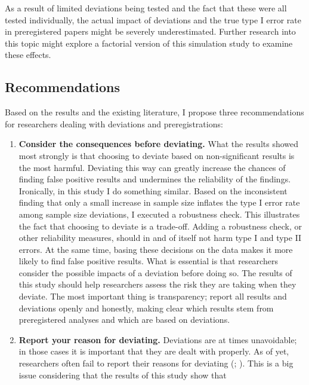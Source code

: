 \documentclass[
  man,
  floatsintext,
  longtable,
  nolmodern,
  notxfonts,
  notimes,
  colorlinks=true,linkcolor=blue,citecolor=blue,urlcolor=blue]{apa7}
\begin{document}
As a result of limited deviations being tested and the fact that these
were all tested individually, the actual impact of deviations and the
true type I error rate in preregistered papers might be severely
underestimated. Further research into this topic might explore a
factorial version of this simulation study to examine these effects.

\subsection{Recommendations}\label{recommendations}

Based on the results and the existing literature, I propose three
recommendations for researchers dealing with deviations and
preregistrations:

\begin{enumerate}
\def\labelenumi{\arabic{enumi}.}
\item
  \textbf{Consider the consequences before deviating.} What the results
  showed most strongly is that choosing to deviate based on
  non-significant results is the most harmful. Deviating this way can
  greatly increase the chances of finding false positive results and
  undermines the reliability of the findings. Ironically, in this study
  I do something similar. Based on the inconsistent finding that only a
  small increase in sample size inflates the type I error rate among
  sample size deviations, I executed a robustness check. This
  illustrates the fact that choosing to deviate is a trade-off. Adding a
  robustness check, or other reliability measures, should in and of
  itself not harm type I and type II errors. At the same time, basing
  these decisions on the data makes it more likely to find false
  positive results. What is essential is that researchers consider the
  possible impacts of a deviation before doing so. The results of this
  study should help researchers assess the risk they are taking when
  they deviate. The most important thing is transparency; report all
  results and deviations openly and honestly, making clear which results
  stem from preregistered analyses and which are based on deviations.
\item
  \textbf{Report your reason for deviating.} Deviations are at times
  unavoidable; in those cases it is important that they are dealt with
  properly. As of yet, researchers often fail to report their reasons
  for deviating (;
  ). This is a
  big issue considering that the results of this study show that

\end{enumerate}
\end{document}
